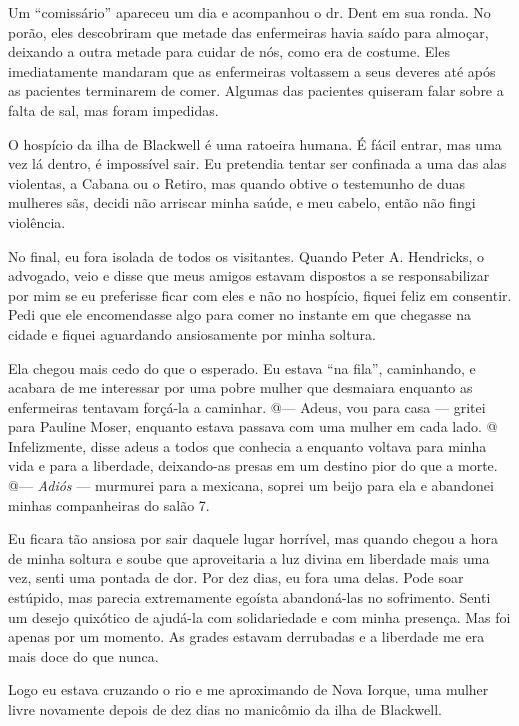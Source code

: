 Um ``comissário'' apareceu um dia e acompanhou o dr. Dent em sua ronda.
No porão, eles descobriram que metade das enfermeiras havia saído para
almoçar, deixando a outra metade para cuidar de nós, como era de
costume. Eles imediatamente mandaram que as enfermeiras voltassem a seus
deveres até após as pacientes terminarem de comer. Algumas das pacientes
quiseram falar sobre a falta de sal, mas foram impedidas.

O hospício da ilha de Blackwell é uma ratoeira humana. É fácil entrar,
mas uma vez lá dentro, é impossível sair. Eu pretendia tentar ser
confinada a uma das alas violentas, a Cabana ou o Retiro, mas quando
obtive o testemunho de duas mulheres sãs, decidi não arriscar minha
saúde, e meu cabelo, então não fingi violência.

No final, eu fora isolada de todos os visitantes. Quando Peter A.
Hendricks, o advogado, veio e disse que meus amigos estavam dispostos a
se responsabilizar por mim se eu preferisse ficar com eles e não no
hospício, fiquei feliz em consentir. Pedi que ele encomendasse algo para
comer no instante em que chegasse na cidade e fiquei aguardando
ansiosamente por minha soltura.

Ela chegou mais cedo do que o esperado. Eu estava ``na fila'',
caminhando, e acabara de me interessar por uma pobre mulher que
desmaiara enquanto as enfermeiras tentavam forçá-la a caminhar. @---
Adeus, vou para casa --- gritei para Pauline Moser, enquanto estava
passava com uma mulher em cada lado. @ Infelizmente, disse adeus a todos
que conhecia a enquanto voltava para minha vida e para a liberdade,
deixando-as presas em um destino pior do que a morte. @--- \emph{Adiós}
--- murmurei para a mexicana, soprei um beijo para ela e abandonei
minhas companheiras do salão 7.

Eu ficara tão ansiosa por sair daquele lugar horrível, mas quando chegou
a hora de minha soltura e soube que aproveitaria a luz divina em
liberdade mais uma vez, senti uma pontada de dor. Por dez dias, eu fora
uma delas. Pode soar estúpido, mas parecia extremamente egoísta
abandoná-las no sofrimento. Senti um desejo quixótico de ajudá-la com
solidariedade e com minha presença. Mas foi apenas por um momento. As
grades estavam derrubadas e a liberdade me era mais doce do que nunca.

Logo eu estava cruzando o rio e me aproximando de Nova Iorque, uma
mulher livre novamente depois de dez dias no manicômio da ilha de
Blackwell.

\label{section-11}

